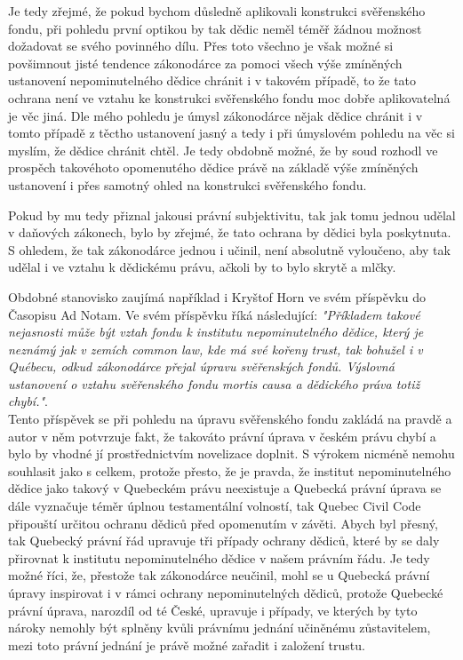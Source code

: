 \documentclass{article}
\begin{document}

Je tedy zřejmé, že pokud bychom důsledně aplikovali konstrukci svěřenského fondu, při pohledu první optikou by tak dědic neměl téměř žádnou možnost dožadovat se svého povinného dílu. Přes toto všechno je však možné si povšimnout jisté tendence zákonodárce za pomoci všech výše zmíněných ustanovení nepominutelného dědice chránit i v takovém případě, to že tato ochrana není ve vztahu ke konstrukci svěřenského fondu moc dobře aplikovatelná je věc jiná. Dle mého pohledu je úmysl zákonodárce nějak dědice chránit i v tomto případě z těctho ustanovení jasný a tedy i při úmyslovém pohledu na věc si myslím, že dědice chránit chtěl. Je tedy obdobně možné, že by soud rozhodl ve prospěch takovéhoto opomenutého dědice právě na základě výše zmíněných ustanovení i přes samotný ohled na konstrukci svěřenského fondu.

Pokud by mu tedy přiznal jakousi právní subjektivitu, tak jak tomu jednou udělal v daňových zákonech, bylo by zřejmé, že tato ochrana by dědici byla poskytnuta. S ohledem, že tak zákonodárce jednou i učinil, není absolutně vyloučeno, aby tak udělal i ve vztahu k dědickému právu, ačkoli by to bylo skrytě a mlčky.










Obdobné stanovisko zaujímá například i Kryštof Horn ve svém příspěvku do Časopisu Ad Notam. Ve svém příspěvku říká následující: \textit{"Příkladem takové nejasnosti může být vztah fondu k institutu nepominutelného dědice, který je neznámý jak v zemích common law, kde má své kořeny trust, tak bohužel i v Québecu, odkud zákonodárce přejal úpravu svěřenských fondů. Výslovná ustanovení o vztahu svěřenského fondu mortis causa a dědického práva totiž chybí."}.  \\

Tento příspěvek se při pohledu na úpravu svěřenského fondu zakládá na pravdě a autor v něm potvrzuje fakt, že takováto právní úprava v českém právu chybí a bylo by vhodné jí prostřednictvím novelizace doplnit. S výrokem nicméně nemohu souhlasit jako s celkem, protože přesto, že je pravda, že institut nepominutelného dědice jako takový v Quebeckém právu neexistuje a Quebecká právní úprava se dále vyznačuje téměr úplnou testamentální volností, tak Quebec Civil Code připouští určitou ochranu dědiců před opomenutím v závěti. Abych byl přesný, tak Quebecký právní řád upravuje tři případy ochrany dědiců, které by se daly přirovnat k institutu nepominutelného dědice v našem právním řádu. Je tedy možné říci, že, přestože tak zákonodárce neučinil, mohl se u Quebecká právní úpravy inspirovat i v rámci ochrany nepominutelných dědiců, protože Quebecké právní úprava, narozdíl od té České, upravuje i případy, ve kterých by tyto nároky nemohly být splněny kvůli právnímu jednání učiněnému zůstavitelem, mezi toto právní jednání je právě možné zařadit i založení trustu. \\
\end{document}
